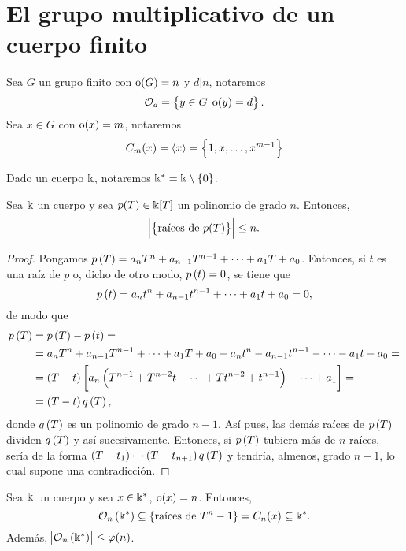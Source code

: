 \section{El grupo multiplicativo de un cuerpo finito}

\begin{obs}[Notación]
    Sea $G$ un grupo finito con $\operatorname{o}(G) = n$ y $d \vert n$, notaremos
    \[
        \mathcal{O}_d = \left\{y \in G \vert \operatorname{o}(y) = d\right\}.
    \]
    Sea $x \in G$ con $\operatorname{o}(x) = m$, notaremos
    \[
        C_m(x) = \langle x \rangle = \left\{1, x, \dots, x^{m-1}\right\}
    \]
\end{obs}

\begin{obs}[Notación]
    Dado un cuerpo $\Bbbk$, notaremos $\Bbbk^\ast = \Bbbk \setminus \left\{0\right\}$.
\end{obs}

\begin{lema}
    Sea $\Bbbk$ un cuerpo y sea $p(T) \in \Bbbk[T]$ un polinomio de grado $n$. Entonces,
    \[
        \abs{\left\{\text{raíces de } p(T)\right\}} \leq n.
    \]
\end{lema}
\begin{proof}
    Pongamos $p\left( T\right) = a_nT^n+a_{n-1}T^{n-1}+\cdots+a_1T+a_0$. Entonces, si $t$ es una raíz de $p$ o, dicho de otro modo, $p\left( t\right) = 0$, se tiene que
    \[
        p\left( t\right) = a_nt^n+a_{n-1}t^{n-1}+\cdots+a_1t+a_0=0,
    \]
    de modo que
    \begin{align*}
        p\left( T\right) &= p\left( T\right) - p\left( t\right) =\\
        &= a_nT^n+a_{n-1}T^{n-1}+\cdots+a_1T+a_0-a_nt^n-a_{n-1}t^{n-1}-\cdots-a_1t-a_0=\\
        &= \left( T-t\right)\left[ a_n\left( T^{n-1} + T^{n-2}t+ \cdots +Tt^{n-2} +t^{n-1}\right) + \cdots+ a_1\right]=\\
        &= \left( T-t\right) q\left( T\right),
    \end{align*}
    donde $q\left( T\right)$ es un polinomio de grado $n-1$. Así pues, las demás raíces de $p\left( T\right)$ dividen $q\left( T\right)$ y así sucesivamente. Entonces, si $p\left( T\right)$ tubiera más de $n$ raíces, sería de la forma $\left( T-t_1\right) \cdots \left( T-t_{n+1}\right) q\left( T\right)$ y tendría, almenos, grado $n+1$, lo cual supone una contradicción.
\end{proof}

\begin{lema}
    Sea $\Bbbk$ un cuerpo y sea $x \in \Bbbk^\ast$, $\operatorname{o}(x) = n$. Entonces,
    \[
        \mathcal{O}_n\left( \Bbbk^\ast \right) \subseteq \left\{ \text{raíces de } T^n -1\right\}
        = C_n(x) \subseteq \Bbbk^\ast.
    \]
    Además, $\abs{\mathcal{O}_n\left( \Bbbk^\ast \right)} \leq \varphi(n)$.
\end{lema}

